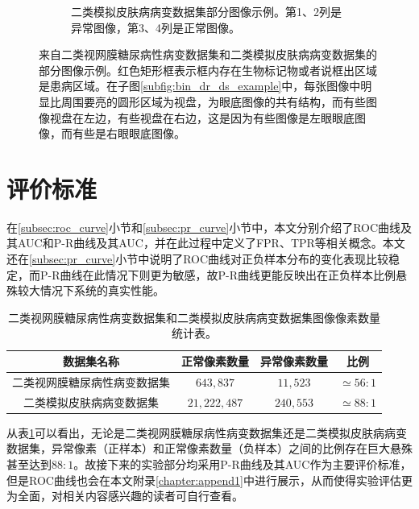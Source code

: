 \begin{figure}[h!]
\begin{subfigure}{0.48\textwidth}
		\caption{二类模拟皮肤病病变数据集部分图像示例。第1、2列是异常图像，第3、4列是正常图像。}
		\label{subfig:bin_simulate_skin_example}
	\end{subfigure}
	\caption{来自二类视网膜糖尿病性病变数据集和二类模拟皮肤病病变数据集的部分图像示例。红色矩形框表示框内存在生物标记物或者说框出区域是患病区域。在子图\ref{subfig:bin_dr_ds_example}中，每张图像中明显比周围要亮的圆形区域为视盘，为眼底图像的共有结构，而有些图像视盘在左边，有些视盘在右边，这是因为有些图像是左眼眼底图像，而有些是右眼眼底图像。}
	\label{mul_fig:bin_ds_example}
\end{figure}
\section{评价标准}
在\ref{subsec:roc_curve}小节和\ref{subsec:pr_curve}小节中，本文分别介绍了ROC曲线及其AUC和P-R曲线及其AUC，并在此过程中定义了FPR、TPR等相关概念。本文还在\ref{subsec:pr_curve}小节中说明了ROC曲线对正负样本分布的变化表现比较稳定，而P-R曲线在此情况下则更为敏感，故P-R曲线更能反映出在正负样本比例悬殊较大情况下系统的真实性能。

\begin{table}[h]
	\centering
	\caption{二类视网膜糖尿病性病变数据集和二类模拟皮肤病病变数据集图像像素数量统计表。}
	\label{tab:bin_ds_pixel_freqs}
	\begin{tabular}{c|c|c|c}
		\toprule[2pt]
		数据集名称 & 正常像素数量 & 异常像素数量 & 比例 \\
		\midrule[2pt]
		二类视网膜糖尿病性病变数据集&  $643,837$ & $11,523$ & $\simeq 56: 1$ \\ \hline
		二类模拟皮肤病病变数据集 & $21,222,487$ & $240,553$ & $\simeq 88: 1$ \\
		\bottomrule[2pt]
	\end{tabular}
\end{table}

\noindent 从表\ref{tab:bin_ds_pixel_freqs}可以看出，无论是二类视网膜糖尿病性病变数据集还是二类模拟皮肤病病变数据集，异常像素（正样本）和正常像素数量（负样本）之间的比例存在巨大悬殊甚至达到$88:1$。故接下来的实验部分均采用P-R曲线及其AUC作为主要评价标准，但是ROC曲线也会在本文附录\ref{chapter:append1}中进行展示，从而使得实验评估更为全面，对相关内容感兴趣的读者可自行查看。
